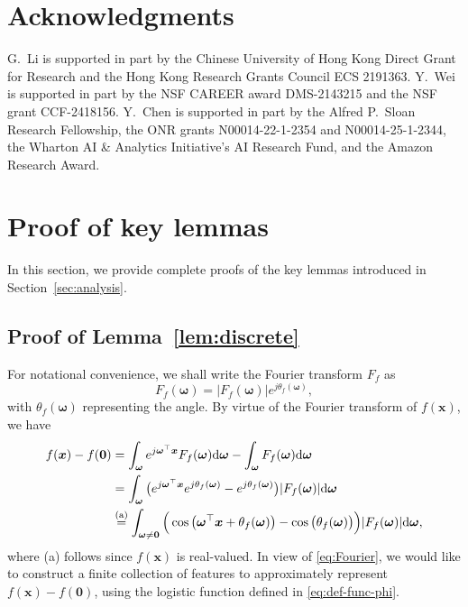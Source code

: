 \documentclass[english]{article}
\begin{document}




\section*{Acknowledgments}

G.~Li is supported in part by the Chinese University of Hong Kong Direct Grant for Research and the Hong Kong Research Grants Council ECS 2191363.
Y.~Wei is supported in part by the NSF 
CAREER award DMS-2143215 and the NSF grant CCF-2418156.  
Y.~Chen is supported in part by the Alfred P.~Sloan Research Fellowship,  the ONR grants N00014-22-1-2354 and N00014-25-1-2344, %
the Wharton AI \& Analytics Initiative's AI Research Fund, 
and the Amazon Research Award. 

\appendix

\section{Proof of key lemmas}

In this section, we provide complete proofs of the key lemmas introduced in Section~\ref{sec:analysis}. 


\subsection{Proof of Lemma~\ref{lem:discrete}}
\label{subsec:proof-lem-discrete}

For notational convenience, we shall write the Fourier transform $F_f$ as
%
\begin{equation}
    F_f(\bm{\omega}) = |F_f(\bm{\omega})| e^{j \theta_f(\bm{\omega})}, 
\end{equation}
%
with $\theta_f(\bm{\omega})$ representing the angle.
By virtue of the Fourier transform of $f({\bm x})$, we have
%
\begin{align}
f({\bm x}) -f(\bm{0})
&=   \int_{\bm{\omega}} e^{j{\bm{\omega}}^{\top}{\bm x}} F_f({\bm{\omega}})\mathrm{d} {\bm{\omega}}
- \int_{\bm{\omega}} F_f({\bm{\omega}})\mathrm{d} {\bm{\omega}}
\notag\\
&=  \int_{\bm{\omega}} \big(e^{j{\bm{\omega}}^{\top}{\bm x}}e^{j\theta_f(\bm{\omega})} - e^{j\theta_f(\bm{\omega})}\big)|F_f({\bm{\omega}})|\mathrm{d} {\bm{\omega}}\notag\\
&\overset{\text{(a)}}{=} \int_{\bm{\omega}\ne \bm{0}}\Big(\cos\big({\bm{\omega}}^{\top}{\bm x} + \theta_f(\bm{\omega})\big) - \cos\big(\theta_f(\bm{\omega})\big)\Big)|F_f({\bm{\omega}})| \mathrm{d}\bm{\omega}, \label{eq:Fourier}
\end{align}
%
where (a) follows since $f({\bm x})$ is real-valued.
In view of \eqref{eq:Fourier}, we would like to construct a finite collection of features to approximately represent $f(\bm{x})-f(\bm{0})$, using the logistic function defined in \eqref{eq:def-func-phi}. 
\end{document}
